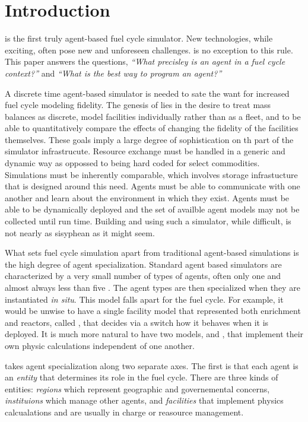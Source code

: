 \section{Introduction}
\label{sec-intro}

\Cyclus \citeme is the first truly agent-based \citeme fuel cycle simulator. 
New technologies, while exciting, often pose new and unforeseen challenges.
\Cyclus is no exception to this rule.  This paper answers the questions,
\emph{``What precisley is an agent in a fuel cycle context?''} and 
\emph{``What is the best way to program an agent?''}

A discrete time agent-based simulator is needed to sate the want for increased 
fuel cycle modeling fidelity. The genesis of \cyclus lies in the desire to 
treat mass balances as discrete, model facilities individually rather than as 
a fleet, and to be able to quantitatively compare the effects of changing the 
fidelity of the facilities themselves. These goals imply a large degree of 
sophistication on th part of the simulator infrastrucute.  Resource exchange
must be handled in a generic and dynamic way as oppossed to being hard coded 
for select commodities. Simulations must be inherently comparable, which involves 
storage infrastucture that is designed around this need. Agents must be able 
to communicate with one another and learn about the environment in which they 
exist. Agents must be able to be dynamically deployed and the set of 
availble agent models may not be collected until run time. Building and using such a
simulator, while difficult, is not nearly as sisyphean as it might seem. 

What sets fuel cycle simulation apart from traditional agent-based simulations 
is the high degree of agent specialization. Standard agent based simulators
are characterized by a very small number of types of agents, often only one and 
almost always less than five \citeme. The agent types are then specialized 
when they are instantiated \emph{in situ}. This model falls apart for the 
fuel cycle.  For example, it would be unwise to have a single facility model 
that represented both enrichment and reactors, called ,
that decides via a switch how it behaves when it is deployed. It is much 
more natural to have two models,  and , 
that implement their own physic calculations independent of one another.

\Cyclus takes agent specialization along two separate axes. The first is 
that each agent is an \emph{entity} that determines its role in the 
fuel cycle. There are three kinds of entities: \emph{regions} which 
represent geographic and governemental concerns, \emph{instituions} 
which manage other agents, and \emph{facilities} that implement 
physics calcualations and are usually in charge or reasource management.

